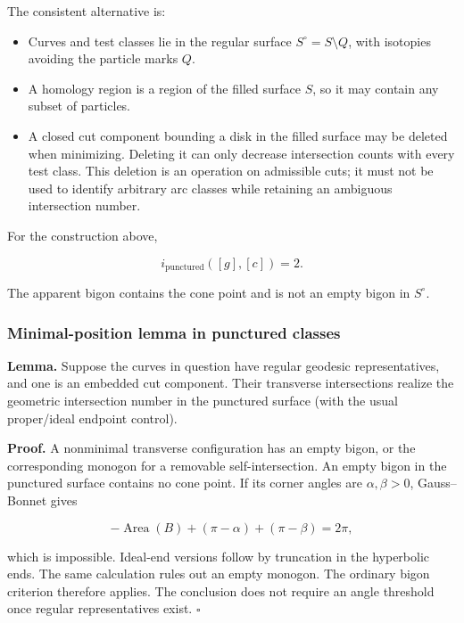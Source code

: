 \documentclass[11pt]{article}
\providecommand{\tightlist}{\setlength{\itemsep}{1pt}\setlength{\parskip}{0pt}}
\begin{document}
The consistent alternative is:

\begin{itemize}
\tightlist
\item
  Curves and test classes lie in the regular surface
  \(S^\circ=S\setminus Q\), with isotopies avoiding the particle marks
  \(Q\).
\item
  A homology region is a region of the filled surface \(S\), so it may
  contain any subset of particles.
\item
  A closed cut component bounding a disk in the filled surface may be
  deleted when minimizing. Deleting it can only decrease intersection
  counts with every test class. This deletion is an operation on
  admissible cuts; it must not be used to identify arbitrary arc classes
  while retaining an ambiguous intersection number.
\end{itemize}

For the construction above,

\[
i_{\mathrm{punctured}}([g],[c])=2.
\]

The apparent bigon contains the cone point and is not an empty bigon in
\(S^\circ\).

\subsubsection{Minimal-position lemma in punctured
classes}\label{minimal-position-lemma-in-punctured-classes}

\textbf{Lemma.} Suppose the curves in question have regular geodesic
representatives, and one is an embedded cut component. Their transverse
intersections realize the geometric intersection number in the punctured
surface (with the usual proper/ideal endpoint control).

\textbf{Proof.} A nonminimal transverse configuration has an empty
bigon, or the corresponding monogon for a removable self-intersection.
An empty bigon in the punctured surface contains no cone point. If its
corner angles are \(\alpha,\beta>0\), Gauss--Bonnet gives

\[
-\operatorname{Area}(B)+(\pi-\alpha)+(\pi-\beta)=2\pi,
\]

which is impossible. Ideal-end versions follow by truncation in the
hyperbolic ends. The same calculation rules out an empty monogon. The
ordinary bigon criterion therefore applies. The conclusion does not
require an angle threshold once regular representatives exist.
\(\square\)
\end{document}
